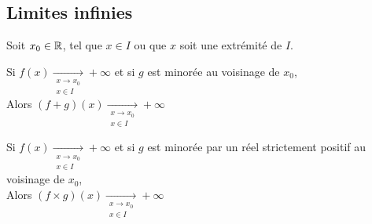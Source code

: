 \documentclass[12pt,twoside,a4paper]{article}
\begin{document}
		\subsection{Limites infinies}
			Soit $x_0\in\mathbb{R}$, tel que $x\in I$ ou que $x$ soit une extrémité de $I$.
			\begin{liste}
				\item Si $f(x)\mathop{\longrightarrow}\limits_{\substack{x\rightarrow x_0\\x\in I}}+\infty$ et si $g$ est minorée au voisinage de $x_0$,\\
					Alors $(f+g)(x)\mathop{\longrightarrow}\limits_{\substack{x\rightarrow x_0\\x\in I}}+\infty$\\
				\item Si $f(x)\mathop{\longrightarrow}\limits_{\substack{x\rightarrow x_0\\x\in I}}+\infty$ et si $g$ est minorée par un réel strictement positif au voisinage de $x_0$,\\
					Alors $(f\times g)(x)\mathop{\longrightarrow}\limits_{\substack{x\rightarrow x_0\\x\in I}}+\infty$
			\end{liste}
\end{document}
